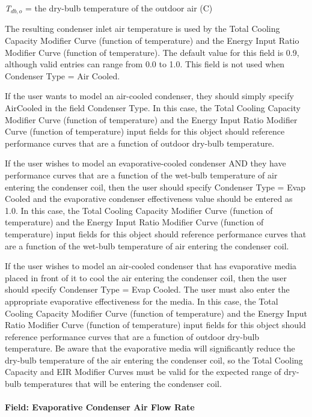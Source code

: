 \emph{T\(_{db,o}\)} = the dry-bulb temperature of the outdoor air (C)

The resulting condenser inlet air temperature is used by the Total Cooling Capacity Modifier Curve (function of temperature) and the Energy Input Ratio Modifier Curve (function of temperature). The default value for this field is 0.9, although valid entries can range from 0.0 to 1.0. This field is not used when Condenser Type = Air Cooled.

If the user wants to model an air-cooled condenser, they should simply specify AirCooled in the field Condenser Type. In this case, the Total Cooling Capacity Modifier Curve (function of temperature) and the Energy Input Ratio Modifier Curve (function of temperature) input fields for this object should reference performance curves that are a function of outdoor dry-bulb temperature.

If the user wishes to model an evaporative-cooled condenser AND they have performance curves that are a function of the wet-bulb temperature of air entering the condenser coil, then the user should specify Condenser Type = Evap Cooled and the evaporative condenser effectiveness value should be entered as 1.0. In this case, the Total Cooling Capacity Modifier Curve (function of temperature) and the Energy Input Ratio Modifier Curve (function of temperature) input fields for this object should reference performance curves that are a function of the wet-bulb temperature of air entering the condenser coil.

If the user wishes to model an air-cooled condenser that has evaporative media placed in front of it to cool the air entering the condenser coil, then the user should specify Condenser Type = Evap Cooled. The user must also enter the appropriate evaporative effectiveness for the media. In this case, the Total Cooling Capacity Modifier Curve (function of temperature) and the Energy Input Ratio Modifier Curve (function of temperature) input fields for this object should reference performance curves that are a function of outdoor dry-bulb temperature. Be aware that the evaporative media will significantly reduce the dry-bulb temperature of the air entering the condenser coil, so the Total Cooling Capacity and EIR Modifier Curves must be valid for the expected range of dry-bulb temperatures that will be entering the condenser coil.

\paragraph{Field: Evaporative Condenser Air Flow Rate}\label{field-evaporative-condenser-air-flow-rate}

